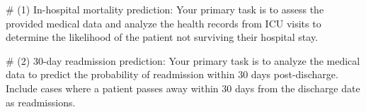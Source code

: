 \begin{tcolorbox}[colback=cadmiumgreen!5!white,colframe=forestgreen!75!white,breakable,title=\textit{Detailed task descriptions for mortality and readmission tasks.}]
\begin{VerbatimWrap}
# (1) In-hospital mortality prediction: Your primary task is to assess the provided medical data and analyze the health records from ICU visits to determine the likelihood of the patient not surviving their hospital stay.

# (2) 30-day readmission prediction: Your primary task is to analyze the medical data to predict the probability of readmission within 30 days post-discharge. Include cases where a patient passes away within 30 days from the discharge date as readmissions.
\end{VerbatimWrap}
\end{tcolorbox}

